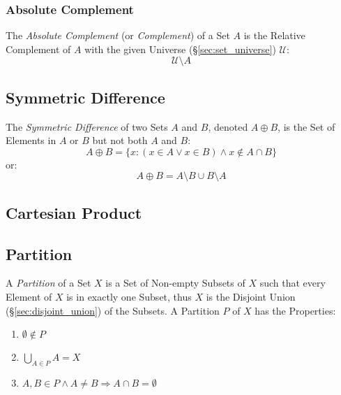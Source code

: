 \subsubsection{Absolute Complement}\label{sec:absolute_complement}

The \emph{Absolute Complement} (or \emph{Complement}) of a Set $A$ is
the Relative Complement of $A$ with the given Universe
(\S\ref{sec:set_universe}) $\mathcal{U}$:
\[
  \mathcal{U} \setminus A
\]



\subsection{Symmetric Difference}\label{sec:symmetric_difference}

The \emph{Symmetric Difference} of two Sets $A$ and $B$, denoted $A
\oplus B$, is the Set of Elements in $A$ or $B$ but not both $A$ and
$B$:
\[
  A \oplus B =
  \{ x : (x \in A \vee x \in B) \wedge x \notin A \cap B \}
\]
or:
\[
  A \oplus B = A \setminus B \cup B \setminus A
\]



\subsection{Cartesian Product}\label{sec:cartesian_product}

\subsection{Partition}\label{sec:set_partition}

A \emph{Partition} of a Set $X$ is a Set of Non-empty Subsets of $X$
such that every Element of $X$ is in exactly one Subset, thus $X$ is
the Disjoint Union (\S\ref{sec:disjoint_union}) of the Subsets. A
Partition $P$ of $X$ has the Properties:
\begin{enumerate}
  \item $\emptyset \notin P$
  \item $\bigcup_{A \in P}A = X$
  \item $A,B \in P \wedge A \neq B \Rightarrow A \cap B = \emptyset$
\end{enumerate}

